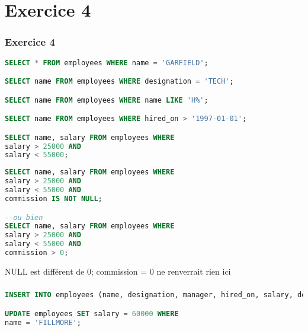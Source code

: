 \documentclass[svgnames,11pt]{beamer}
\begin{document}
\section{Exercice 4}
\begin{frame}[fragile]
    \frametitle{Exercice 4}

\begin{center}
\begin{lstlisting}[language=SQL , basicstyle=\ttfamily\small, xleftmargin=1em, xrightmargin=0em]
SELECT * FROM employees WHERE name = 'GARFIELD';

SELECT name FROM employees WHERE designation = 'TECH';

SELECT name FROM employees WHERE name LIKE 'H%';

SELECT name FROM employees WHERE hired_on > '1997-01-01';

SELECT name, salary FROM employees WHERE 
salary > 25000 AND 
salary < 55000;
\end{lstlisting}
\end{center}    

\end{frame}
\begin{frame}[fragile]

\begin{center}
\begin{lstlisting}[language=SQL , basicstyle=\ttfamily\small, xleftmargin=1em, xrightmargin=0em]
SELECT name, salary FROM employees WHERE 
salary > 25000 AND 
salary < 55000 AND 
commission IS NOT NULL;

--ou bien
SELECT name, salary FROM employees WHERE 
salary > 25000 AND 
salary < 55000 AND 
commission > 0;
\end{lstlisting}
\end{center}    
\begin{aretenir}[Remarque]
    NULL est différent de 0; commission = 0 ne renverrait rien ici
\end{aretenir}
\end{frame}
\begin{frame}[fragile]
    \frametitle{}

\begin{center}
\begin{lstlisting}[language=SQL , basicstyle=\ttfamily\small, xleftmargin=1em, xrightmargin=0em]
INSERT INTO employees (name, designation, manager, hired_on, salary, dept) VALUES ('DURAN', 'TECH', 6, '1999-01-13', 35000, 4);

UPDATE employees SET salary = 60000 WHERE 
name = 'FILLMORE';
\end{lstlisting}
\end{center}

\end{frame}
\end{document}
